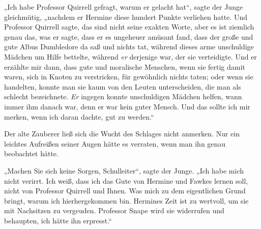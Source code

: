 „Ich habe Professor Quirrell gefragt, warum er gelacht hat“, sagte der Junge gleichmütig, „nachdem er Hermine diese hundert Punkte verliehen hatte. Und Professor Quirrell sagte, das sind nicht seine exakten Worte, aber es ist ziemlich genau das, was er sagte, dass er es ungeheuer amüsant fand, dass der große und gute Albus Dumbledore da saß und nichts tat, während dieses arme unschuldige Mädchen um Hilfe bettelte, während \emph{er} derjenige war, der sie verteidigte. Und er erzählte mir dann, dass gute und moralische Menschen, wenn sie fertig damit waren, sich in Knoten zu verstricken, für gewöhnlich nichts taten; oder wenn sie handelten, konnte man sie kaum von den Leuten unterscheiden, die man als schlecht bezeichnete. \emph{Er} ingegen konnte unschuldigen Mädchen helfen, wann immer ihm danach war, denn er war kein guter Mensch. Und das sollte ich mir merken, wenn ich daran dachte, gut zu werden.“

Der alte Zauberer ließ sich die Wucht des Schlages nicht anmerken. Nur ein leichtes Aufreißen seiner Augen hätte es verraten, wenn man ihn genau beobachtet hätte.

„Machen Sie sich keine Sorgen, Schulleiter“, sagte der Junge. „Ich habe mich nicht verirrt. Ich weiß, dass ich das Gute von Hermine und Fawkes lernen soll, nicht von Professor Quirrell und Ihnen. Was mich zu dem eigentlichen Grund bringt, warum ich hierhergekommen bin. Hermines Zeit ist zu wertvoll, um sie mit Nachsitzen zu vergeuden. Professor Snape wird sie widerrufen und behaupten, ich hätte ihn erpresst.“

